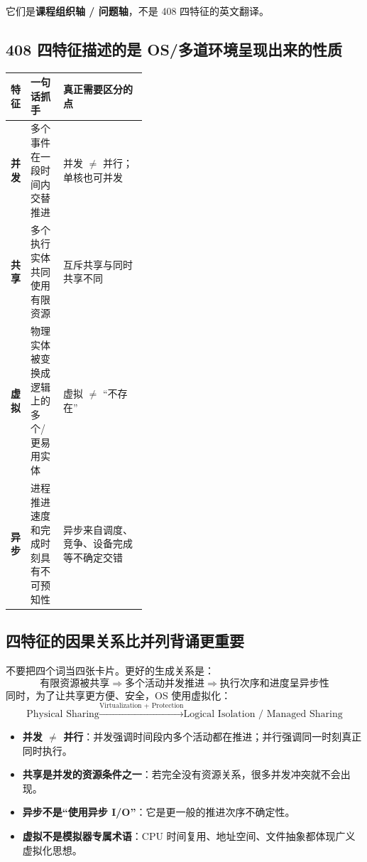 \documentclass[11pt,a4paper]{ctexart}
\newcommand{\kw}[1]{\textbf{#1}}
\begin{document}
它们是\kw{课程组织轴 / 问题轴}，不是 408 四特征的英文翻译。

\subsection{408 四特征描述的是 OS/多道环境呈现出来的性质}

\begin{center}
\begin{tabularx}{\linewidth}{>{\bfseries}p{0.14\linewidth} p{0.24\linewidth} X}
\toprule
特征 & 一句话抓手 & 真正需要区分的点\\
\midrule
并发 & 多个事件在一段时间内交替推进 & 并发 $\neq$ 并行；单核也可并发\\
共享 & 多个执行实体共同使用有限资源 & 互斥共享与同时共享不同\\
虚拟 & 物理实体被变换成逻辑上的多个/更易用实体 & 虚拟 $\neq$ “不存在”\\
异步 & 进程推进速度和完成时刻具有不可预知性 & 异步来自调度、竞争、设备完成等不确定交错\\
\bottomrule
\end{tabularx}
\end{center}

\subsection{四特征的因果关系比并列背诵更重要}

不要把四个词当四张卡片。更好的生成关系是：
\[
\boxed{
\text{有限资源被共享}
\Rightarrow
\text{多个活动并发推进}
\Rightarrow
\text{执行次序和进度呈异步性}
}
\]
同时，为了让共享更方便、安全，OS 使用虚拟化：
\[
\boxed{
\text{Physical Sharing}
\xrightarrow{\text{Virtualization + Protection}}
\text{Logical Isolation / Managed Sharing}
}
\]

\begin{exam}[408 高频辨析]
\begin{itemize}
  \item \kw{并发 $\neq$ 并行}：并发强调时间段内多个活动都在推进；并行强调同一时刻真正同时执行。
  \item \kw{共享是并发的资源条件之一}：若完全没有资源关系，很多并发冲突就不会出现。
  \item \kw{异步不是“使用异步 I/O”}：它是更一般的推进次序不确定性。
  \item \kw{虚拟不是模拟器专属术语}：CPU 时间复用、地址空间、文件抽象都体现广义虚拟化思想。
\end{itemize}
\end{exam}
\end{document}
